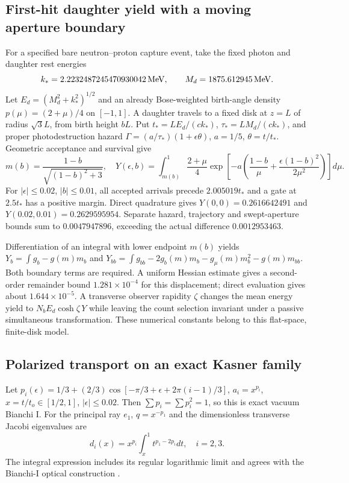 \subsection{First-hit daughter yield with a moving aperture boundary}
For a specified bare neutron--proton capture event, take the fixed photon and daughter rest energies
\begin{equation}
 k_*=2.2232487245470930042\,{\rm MeV},\qquad
 M_d=1875.612945\,{\rm MeV}.
 \label{v:daughter_inputs}
\end{equation} Let $E_d=(M_d^2+k_*^2)^{1/2}$ and an already Bose-weighted birth-angle density $p(\mu)=(2+\mu)/4$ on $[-1,1]$. A daughter travels to a fixed disk at $z=L$ of radius $\sqrt3L$, from birth height $bL$. Put $t_*=LE_d/(ck_*)$, $\tau_*=LM_d/(ck_*)$, and proper photodestruction hazard $\Gamma=(a/\tau_*)(1+\epsilon\theta)$, $a=1/5$, $\theta=t/t_*$. Geometric acceptance and survival give
\begin{equation}
 m(b)=\frac{1-b}{\sqrt{(1-b)^2+3}},\quad
 Y(\epsilon,b)=\int_{m(b)}^1\frac{2+\mu}{4}
 \exp\!\left[-a\left(\frac{1-b}{\mu}
 +\frac{\epsilon(1-b)^2}{2\mu^2}\right)\right]d\mu .
 \label{v:daughter_yield}
\end{equation}
For $|\epsilon|\le0.02$, $|b|\le0.01$, all accepted arrivals precede $2.005019t_*$ and a gate at $2.5t_*$ has a positive margin. Direct quadrature gives $Y(0,0)=0.2616642491$ and $Y(0.02,0.01)=0.2629595954$. Separate hazard, trajectory and swept-aperture bounds sum to $0.0047947896$, exceeding the actual difference $0.0012953463$.

Differentiation of an integral with lower endpoint $m(b)$ yields
$Y_b=\int g_b-g(m)m_b$ and
$Y_{bb}=\int g_{bb}-2g_b(m)m_b-g_\mu(m)m_b^2-g(m)m_{bb}$.
Both boundary terms are required. A uniform Hessian estimate gives a second-order remainder bound $1.281\times10^{-4}$ for this displacement; direct evaluation gives about $1.644\times10^{-5}$. A transverse observer rapidity $\zeta$ changes the mean energy yield to $N_bE_d\cosh\zeta\,Y$ while leaving the count selection invariant under a passive simultaneous transformation. These numerical constants belong to this flat-space, finite-disk model.

\subsection{Polarized transport on an exact Kasner family}
Let
$p_i(\epsilon)=1/3+(2/3)\cos[-\pi/3+\epsilon+2\pi(i-1)/3]$,
$a_i=x^{p_i}$, $x=t/t_o\in[1/2,1]$, $|\epsilon|\le0.02$.
Then $\sum p_i=\sum p_i^2=1$, so this is exact vacuum Bianchi I.
For the principal ray $e_1$, $q=x^{-p_1}$ and the dimensionless transverse Jacobi eigenvalues are
\begin{equation}
 d_i(x)=x^{p_i}\int_x^1t^{p_1-2p_i}dt,\quad i=2,3 .
 \label{v:kasner_jacobi}
\end{equation}
The integral expression includes its regular logarithmic limit and agrees with the Bianchi-I optical construction \cite{Fleury2015}.

